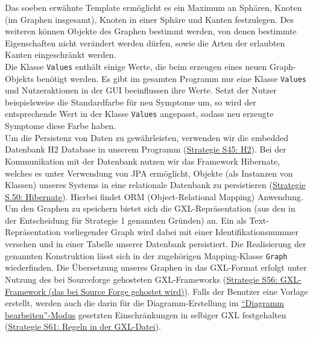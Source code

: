 \documentclass[enabledeprecatedfontcommands,fontsize=11pt,paper=a4,twoside]{scrartcl}
\newcounter{one}
\begin{document}
Das soeben erwähnte Template ermöglicht es ein Maximum an Sphären, Knoten (im Graphen insgesamt), Knoten in einer Sphäre und Kanten festzulegen. Des weiteren können Objekte des Graphen bestimmt werden, von denen bestimmte Eigenschaften nicht verändert werden dürfen, sowie die Arten der erlaubten Kanten eingeschränkt werden.\\

Die Klasse \texttt{Values} enthält einige Werte, die beim erzeugen eines neuen Graph-Objekts benötigt werden. Es gibt im gesamten Programm nur eine Klasse \texttt{Values} und Nutzeraktionen in der GUI beeinflussen ihre Werte. Setzt der Nutzer beispielsweise die Standardfarbe für neu Symptome um, so wird der entsprechende Wert in der Klasse \texttt{Values} angepasst, sodass neu erzeugte Symptome diese Farbe haben.\\

Um die Persistenz von Daten zu gewährleisten, verwenden wir die embedded Datenbank H2 Database in unserem Programm (\hyperlink{ppp}{Strategie S45: H2}). Bei der Kommunikation mit der Datenbank nutzen wir das Framework Hibernate, welches es unter Verwendung von JPA ermöglicht, Objekte (als Instanzen von Klassen) unseres Systems in eine relationale Datenbank zu persistieren (\hyperlink{rrr}{Strategie S.50: Hibernate}). Hierbei findet ORM (Object-Relational Mapping) Anwendung. \\ 

Um den Graphen zu speichern bietet sich die GXL-Repräsentation (aus den in der Entscheidung für Strategie 1 genannten Gründen) an. Ein als Text-Repräsentation vorliegender Graph wird dabei mit einer Identifikationsnummer versehen und in einer Tabelle unserer Datenbank persistiert. Die Realisierung der genannten Konstruktion lässt sich in der zugehörigen Mapping-Klasse \texttt{Graph} wiederfinden.  Die Übersetzung unseres Graphen in das GXL-Format erfolgt unter Nutzung des bei Sourceforge gehosteten GXL-Frameworks (\hyperlink{ttt}{Strategie S56: GXL-Framework (das bei Source Forge gehostet wird)}). Falls der Benutzer eine Vorlage erstellt, werden auch die darin für die Diagramm-Erstellung im \hyperlink{``Diagramm bearbeiten''-Modus}{``Diagramm bearbeiten''-Modus} gesetzten Einschränkungen in selbiger GXL festgehalten (\hyperlink{vvv}{Strategie S61: Regeln in der GXL-Datei}).\\ 
\end{document}
